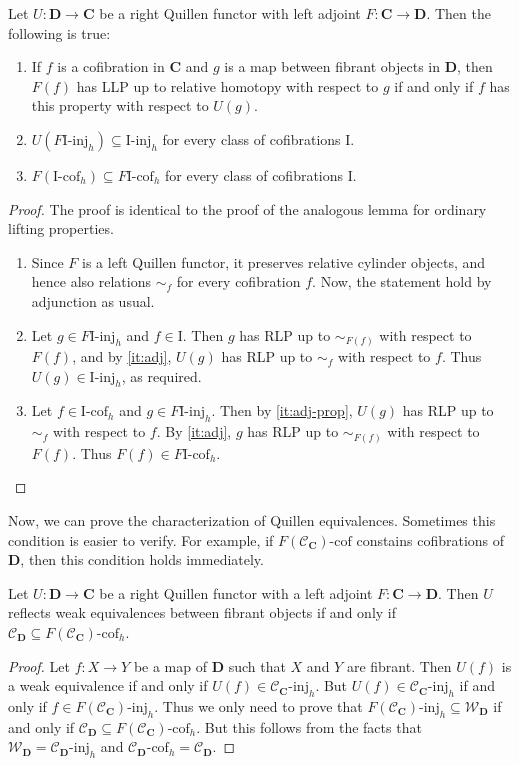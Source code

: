 \documentclass{tac}
\theoremstyle{definition}
\newcommand{\we}{\mathcal{W}}
\newcommand{\cof}{\mathcal{C}}
\newcommand{\cat}[1]{\mathbf{#1}}
\newcommand{\C}{\cat{C}}
\newcommand{\D}{\cat{D}}
\newcommand{\I}{\mathrm{I}}
\newcommand{\class}[2]{#1\text{-}\mathrm{#2}}
\newcommand{\Iinj}[1][\I]{\class{#1}{inj}}
\newcommand{\Icof}[1][\I]{\class{#1}{cof}}
\begin{document}
\begin{lem}
Let $U : \D \to \C$ be a right Quillen functor with left adjoint $F : \C \to \D$.
Then the following is true:
\begin{enumerate}
\item \label{it:adj} If $f$ is a cofibration in $\C$ and $g$ is a map between fibrant objects in $\D$,
then $F(f)$ has LLP up to relative homotopy with respect to $g$ if and only if $f$ has this property with respect to $U(g)$.
\item \label{it:adj-prop} $U(\Iinj[F\I]_h) \subseteq \Iinj_h$ for every class of cofibrations $\I$.
\item $F(\Icof_h) \subseteq \Icof[F\I]_h$ for every class of cofibrations $\I$.
\end{enumerate}
\end{lem}
\begin{proof}
The proof is identical to the proof of the analogous lemma for ordinary lifting properties.
\begin{enumerate}
\item Since $F$ is a left Quillen functor, it preserves relative cylinder objects, and hence also relations $\sim_f$ for every cofibration $f$.
Now, the statement hold by adjunction as usual.
\item Let $g \in \Iinj[F\I]_h$ and $f \in \I$.
Then $g$ has RLP up to $\sim_{F(f)}$ with respect to $F(f)$, and by \eqref{it:adj}, $U(g)$ has RLP up to $\sim_f$ with respect to $f$.
Thus $U(g) \in \Iinj_h$, as required.
\item Let $f \in \Icof_h$ and $g \in \Iinj[F\I]_h$.
Then by \eqref{it:adj-prop}, $U(g)$ has RLP up to $\sim_f$ with respect to $f$.
By \eqref{it:adj}, $g$ has RLP up to $\sim_{F(f)}$ with respect to $F(f)$.
Thus $F(f) \in \Icof[F\I]_h$.
\end{enumerate}
\end{proof}

Now, we can prove the characterization of Quillen equivalences.
Sometimes this condition is easier to verify.
For example, if $\Icof[F(\cof_\C)]$ constains cofibrations of $\D$, then this condition holds immediately.

\begin{prop}
Let $U : \D \to \C$ be a right Quillen functor with a left adjoint $F : \C \to \D$.
Then $U$ reflects weak equivalences between fibrant objects if and only if $\cof_\D \subseteq \Icof[F(\cof_\C)]_h$.
\end{prop}
\begin{proof}
Let $f : X \to Y$ be a map of $\D$ such that $X$ and $Y$ are fibrant.
Then $U(f)$ is a weak equivalence if and only if $U(f) \in \Iinj[\cof_\C]_h$.
But $U(f) \in \Iinj[\cof_\C]_h$ if and only if $f \in \Iinj[F(\cof_\C)]_h$.
Thus we only need to prove that $\Iinj[F(\cof_\C)]_h \subseteq \we_\D$ if and only if $\cof_\D \subseteq \Icof[F(\cof_\C)]_h$.
But this follows from the facts that $\we_\D = \Iinj[\cof_\D]_h$ and $\Icof[\cof_\D]_h = \cof_\D$.
\end{proof}
\end{document}
